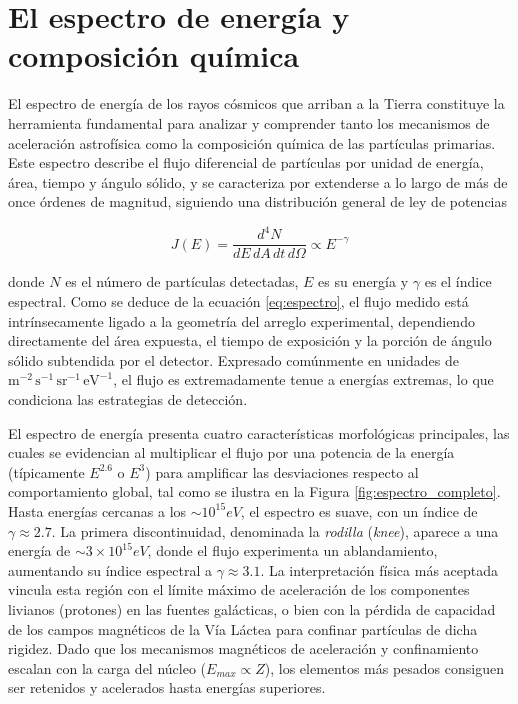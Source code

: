 \section{El espectro de energía y composición química}
\label{subsec:espectro}

El espectro de energía de los rayos cósmicos que arriban a la Tierra constituye la herramienta fundamental para analizar y comprender tanto los mecanismos de aceleración astrofísica como la composición química de las partículas primarias. Este espectro describe el flujo diferencial de partículas por unidad de energía, área, tiempo y ángulo sólido, y se caracteriza por extenderse a lo largo de más de once órdenes de magnitud, siguiendo una distribución general de ley de potencias

\begin{equation}
	J(E) = \frac{d^4N}{dE \, dA \, dt \, d\Omega} \propto E^{-\gamma}
	\label{eq:espectro}
\end{equation}

donde $N$ es el número de partículas detectadas, $E$ es su energía y $\gamma$ es el índice espectral. Como se deduce de la ecuación \ref{eq:espectro}, el flujo medido está intrínsecamente ligado a la geometría del arreglo experimental, dependiendo directamente del área expuesta, el tiempo de exposición y la porción de ángulo sólido subtendida por el detector. Expresado comúnmente en unidades de $\text{m}^{-2} \, \text{s}^{-1} \, \text{sr}^{-1} \, \text{eV}^{-1}$, el flujo es extremadamente tenue a energías extremas, lo que condiciona las estrategias de detección.

El espectro de energía presenta cuatro características morfológicas principales, las cuales se evidencian al multiplicar el flujo por una potencia de la energía (típicamente $E^{2.6}$ o $E^3$) para amplificar las desviaciones respecto al comportamiento global, tal como se ilustra en la Figura \ref{fig:espectro_completo}. Hasta energías cercanas a los $\sim 10^{15}eV$, el espectro es suave, con un índice de $\gamma \approx 2.7$. La primera discontinuidad, denominada la \textit{rodilla} (\textit{knee}), aparece a una energía de $\sim 3 \times 10^{15}eV$, donde el flujo experimenta un ablandamiento, aumentando su índice espectral a $\gamma \approx 3.1$. La interpretación física más aceptada vincula esta región con el límite máximo de aceleración de los componentes livianos (protones) en las fuentes galácticas, o bien con la pérdida de capacidad de los campos magnéticos de la Vía Láctea para confinar partículas de dicha rigidez. Dado que los mecanismos magnéticos de aceleración y confinamiento escalan con la carga del núcleo ($E_{max} \propto Z$), los elementos más pesados consiguen ser retenidos y acelerados hasta energías superiores.


